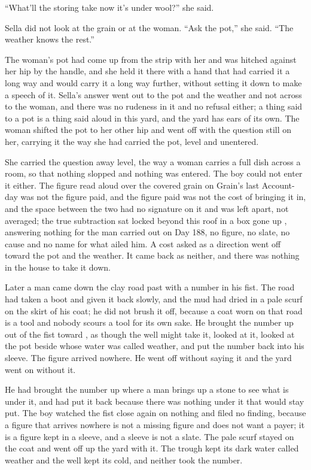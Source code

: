 “What'll the storing take now it's under wool?” she said.

Sella did not look at the grain or at the woman. “Ask the pot,” she said. “The weather knows the rest.”

The woman's pot had come up from the strip with her and was hitched against her hip by the handle, and she held it there with a hand that had carried it a long way and would carry it a long way further, without setting it down to make a speech of it. Sella's answer went out to the pot and the weather and not across to the woman, and there was no rudeness in it and no refusal either; a thing said to a pot is a thing said aloud in this yard, and the yard has ears of its own. The woman shifted the pot to her other hip and went off with the question still on her, carrying it the way she had carried the pot, level and unentered.

She carried the question away level, the way a woman carries a full dish across a room, so that nothing slopped and nothing was entered. The boy could not enter it either. The figure read aloud over the covered grain on Grain's last Account-day was not the figure paid, and the figure paid was not the cost of bringing it in, and the space between the two had no signature on it and was left apart, not averaged; the true subtraction sat locked beyond this roof in a box gone up , answering nothing for the man carried out on Day 188, no figure, no slate, no cause and no name for what ailed him. A cost asked as a direction went off toward the pot and the weather. It came back as neither, and there was nothing in the house to take it down.

Later a man came down the clay road past  with a number in his fist. The road had taken a boot and given it back slowly, and the mud had dried in a pale scurf on the skirt of his coat; he did not brush it off, because a coat worn on that road is a tool and nobody scours a tool for its own sake. He brought the number up out of the fist toward , as though the well might take it, looked at it, looked at the pot beside  whose water was called weather, and put the number back into his sleeve. The figure arrived nowhere. He went off without saying it and the yard went on without it.

He had brought the number up where a man brings up a stone to see what is under it, and had put it back because there was nothing under it that would stay put. The boy watched the fist close again on nothing and filed no finding, because a figure that arrives nowhere is not a missing figure and does not want a payer; it is a figure kept in a sleeve, and a sleeve is not a slate. The pale scurf stayed on the coat and went off up the yard with it. The trough kept its dark water called weather and the well kept its cold, and neither took the number.

